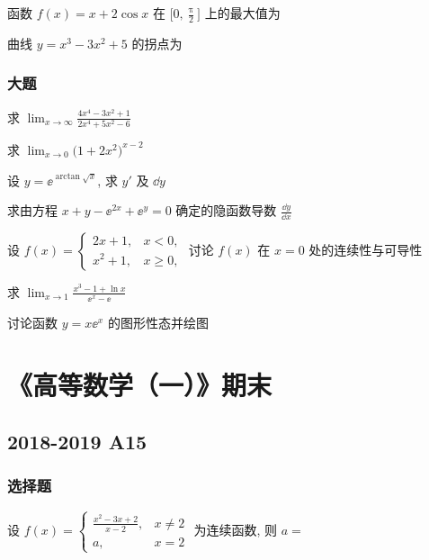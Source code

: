 \begin{ti}
	函数 $f(x) = x + 2 \cos x$ 在 $\bigl[ 0, \frac{\uppi}{2} \bigr]$ 上的最大值为 \hua
\end{ti}

\begin{ti}
	曲线 $y = x^{3} - 3 x^{2} + 5$ 的拐点为 \hua
\end{ti}

\subsubsection{大题}
\begin{ti}
	求 $\lim_{x \to \infty} \frac{4 x^{4} - 3 x^{2} + 1}{2 x^{4} + 5 x^{2} - 6}$
\end{ti}

\begin{ti}
	求 $\lim_{x \to 0} \bigl( 1 + 2x^{2} \bigr)^{x - 2}$
\end{ti}

\begin{ti}
	设 $y = \ee^{\arctan \sqrt{x}}$, 求 $y'$ 及 $\dd{y}$
\end{ti}

\begin{ti}
	求由方程 $x + y - \ee^{2x} + \ee^{y} = 0$ 确定的隐函数导数 $\frac{\dd{y}}{\dd{x}}$
\end{ti}

\begin{ti}
	设 $f(x) = \begin{cases}
		2x + 1, & x < 0, \\
		x^{2} + 1, & x \geqslant 0,
	\end{cases}$ 讨论 $f(x)$ 在 $x = 0$ 处的连续性与可导性
\end{ti}

\begin{ti}
	求 $\lim_{x \to 1} \frac{x^{3} - 1 + \ln x}{\ee^{x} - \ee}$
\end{ti}

\begin{ti}
	讨论函数 $y = x \ee^{x}$ 的图形性态并绘图
\end{ti}

\section{《高等数学（一）》期末}
\subsection{2018-2019 A15}
\subsubsection{选择题}
\begin{ti}
	设 $f(x)=
	\begin{cases}
	\frac{x^2-3x+2}{x-2}, & x\ne2\\
	a, & x=2
	\end{cases}
	$ 为连续函数, 则 $a=$ \kuo
\end{ti}

